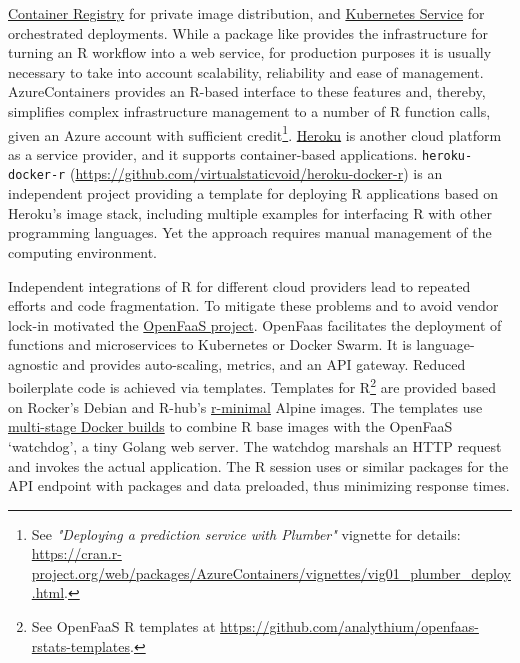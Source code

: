\href{https://azure.microsoft.com/en-us/services/container-registry/}{Container
Registry} for private image distribution, and
\href{https://azure.microsoft.com/en-us/services/kubernetes-service/}{Kubernetes
Service} for orchestrated deployments. While a package like
 provides the infrastructure for turning an R workflow into
a web service, for production purposes it is usually necessary to take
into account scalability, reliability and ease of management.
AzureContainers provides an R-based interface to these features and,
thereby, simplifies complex infrastructure management to a number of R
function calls, given an Azure account with sufficient
credit\footnote{See \emph{"Deploying a prediction service with Plumber"} vignette for details:  \href{https://cran.r-project.org/web/packages/AzureContainers/vignettes/vig01_plumber_deploy.html}{https://cran.r-project.org/web/packages/AzureContainers/vignettes/vig01\_plumber\_deploy.html}.}.
\href{https://www.heroku.com/}{Heroku} is another cloud platform as a
service provider, and it supports container-based applications.
\texttt{heroku-docker-r}
(\url{https://github.com/virtualstaticvoid/heroku-docker-r}) is an
independent project providing a template for deploying R applications
based on Heroku's image stack, including multiple examples for
interfacing R with other programming languages. Yet the approach
requires manual management of the computing environment.

Independent integrations of R for different cloud providers lead to
repeated efforts and code fragmentation. To mitigate these problems and
to avoid vendor lock-in motivated the
\href{https://www.openfaas.com/}{OpenFaaS project}. OpenFaas facilitates
the deployment of functions and microservices to Kubernetes or Docker
Swarm. It is language-agnostic and provides auto-scaling, metrics, and
an API gateway. Reduced boilerplate code is achieved via templates.
Templates for
R\footnote{See OpenFaaS R templates at \href{https://github.com/analythium/openfaas-rstats-templates}{https://github.com/analythium/openfaas-rstats-templates}.}
are provided based on Rocker's Debian and R-hub's
\href{https://github.com/r-hub/r-minimal}{r-minimal} Alpine images. The
templates use
\href{https://docs.docker.com/develop/develop-images/multistage-build/}{multi-stage
Docker builds} to combine R base images with the OpenFaaS `watchdog', a
tiny Golang web server. The watchdog marshals an HTTP request and
invokes the actual application. The R session uses  or
similar packages for the API endpoint with packages and data preloaded,
thus minimizing response times.

